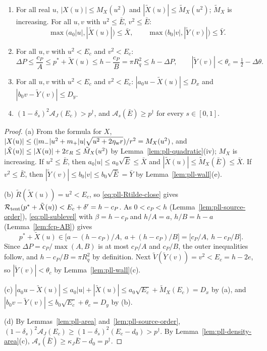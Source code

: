 \begin{lemma}\label{lem:pll-bounds}
\begin{enumerate}[label=(\alph*)]
\item For all real $u$, $|X(u)|\le M_X(u^2)$ and $|\tilde X(u)|\le\tilde M_X(u^2)$; $\tilde M_X$ is increasing. For all
 $u,v$ with $u^2\le\bar E$, $v^2\le\bar E$:
 \[
  \max\bigl(a_0|u|,|\tilde X(u)|\bigr)\le\bar X,\qquad \max\bigl(b_0|v|,|\tilde Y(v)|\bigr)\le\bar Y .
 \]
\item For all $u,v$ with $u^2<E_c$ and $v^2<E_c$:
 \[
  \Delta P\le\frac{c_P}A\le p^*+\tilde X(u)\le h-\frac{c_P}B=\pi R_q^2\le h-\Delta P,\qquad
  |\tilde Y(v)|<\theta_c=\tfrac12-\Delta\theta .
 \]
\item For all $u,v$ with $u^2<E_c$ and $v^2<E_c$: $|a_0u-\tilde X(u)|\le D_x$ and $|b_0v-\tilde Y(v)|\le D_y$.
\item $(1-\delta_s)^2\mathcal A_J(E_c)>p^\dagger$, and $\mathcal A_s(\bar E)\ge p^\dagger$ for every $s\in[0,1]$.
\end{enumerate}
\end{lemma}

\begin{proof}
(a) From the formula for $X$, $|X(u)|\le(|m_-|u^2+m_+|u|\sqrt{u^2+2\eta_{\rm w} r})/r^2=M_X(u^2)$, and
$|\tilde X(u)|\le|X(u)|+2\varepsilon_R\le\tilde M_X(u^2)$ by Lemma~\ref{lem:pll-quadratic}(iv); $M_X$ is increasing. If
$u^2\le\bar E$, then $a_0|u|\le a_0\sqrt{\bar E}\le\bar X$ and $|\tilde X(u)|\le\tilde M_X(\bar E)\le\bar X$. If
$v^2\le\bar E$, then $|\tilde Y(v)|\le b_0|v|\le b_0\sqrt{\bar E}=\bar Y$ by Lemma~\ref{lem:pll-wall}(e).

(b) $\tilde R(\tilde X(u))=u^2<E_c$, so \eqref{eq:pll-Rtilde-close} gives
$\mathcal{R}_{\rm tent}(p^*+\tilde X(u))<E_c+\delta'=h-c_P$. As $0<c_P<h$ (Lemma~\ref{lem:pll-source-order}),
\eqref{eq:pll-sublevel} with $\beta=h-c_P$ and $h/A=a$, $h/B=h-a$ (Lemma~\ref{lem:fcp-AB}) gives
\[
 p^*+\tilde X(u)\in\bigl[a-(h-c_P)/A,\ a+(h-c_P)/B\bigr]=\bigl[c_P/A,\ h-c_P/B\bigr].
\]
Since $\Delta P=c_P/\max(A,B)$ is at most $c_P/A$ and $c_P/B$, the outer inequalities follow, and
$h-c_P/B=\pi R_q^2$ by definition. Next $\tilde V(\tilde Y(v))=v^2<E_c=h-2e$, so $|\tilde Y(v)|<\theta_c$ by
Lemma~\ref{lem:pll-wall}(c).

(c) $|a_0u-\tilde X(u)|\le a_0|u|+|\tilde X(u)|\le a_0\sqrt{E_c}+\tilde M_X(E_c)=D_x$ by (a), and
$|b_0v-\tilde Y(v)|\le b_0\sqrt{E_c}+\theta_c=D_y$ by (b).

(d) By Lemmas~\ref{lem:pll-area} and~\ref{lem:pll-source-order},
$(1-\delta_s)^2\mathcal A_J(E_c)\ge(1-\delta_s)^2(E_c-d_0)>p^\dagger$. By Lemma~\ref{lem:pll-density-area}(c),
$\mathcal A_s(\bar E)\ge\kappa_J\bar E-d_0=p^\dagger$.
\end{proof}

